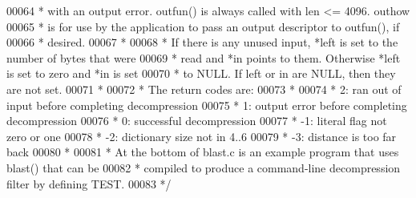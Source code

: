 \begin{DoxyCode}
00064 \textcolor{comment}{ * with an output error.  outfun() is always called with len <= 4096.  outhow}
00065 \textcolor{comment}{ * is for use by the application to pass an output descriptor to outfun(), if}
00066 \textcolor{comment}{ * desired.}
00067 \textcolor{comment}{ *}
00068 \textcolor{comment}{ * If there is any unused input, *left is set to the number of bytes that were}
00069 \textcolor{comment}{ * read and *in points to them.  Otherwise *left is set to zero and *in is set}
00070 \textcolor{comment}{ * to NULL.  If left or in are NULL, then they are not set.}
00071 \textcolor{comment}{ *}
00072 \textcolor{comment}{ * The return codes are:}
00073 \textcolor{comment}{ *}
00074 \textcolor{comment}{ *   2:  ran out of input before completing decompression}
00075 \textcolor{comment}{ *   1:  output error before completing decompression}
00076 \textcolor{comment}{ *   0:  successful decompression}
00077 \textcolor{comment}{ *  -1:  literal flag not zero or one}
00078 \textcolor{comment}{ *  -2:  dictionary size not in 4..6}
00079 \textcolor{comment}{ *  -3:  distance is too far back}
00080 \textcolor{comment}{ *}
00081 \textcolor{comment}{ * At the bottom of blast.c is an example program that uses blast() that can be}
00082 \textcolor{comment}{ * compiled to produce a command-line decompression filter by defining TEST.}
00083 \textcolor{comment}{ */}
\end{DoxyCode}
